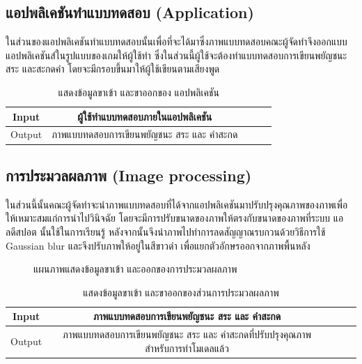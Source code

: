 \documentclass[12pt,oneside,openright,a4paper]{cpe-thai-project}
\begin{document}
\subsection{แอปพลิเคชันทำแบบทดสอบ (Application)}
ในส่วนของแอปพลิเคชันทำแบบทดสอบนั้นเพื่อที่จะได้มาซึ่งภาพแบบทดสอบคณะผู้จัดทำจึงออกแบบแอปพลิเคชันส์ในรูปแบบของเกมให้ผู้ใช้ทำ ซึ่งในส่วนนี้ผู้ใช้จะต้องทำแบบทดสอบการเขียนพยัญชนะ สระ และสะกดคำ โดยจะมีกรอบขึ้นมาให้ผู้ใช้เขียนตามเสียงพูด 
\begin{table}[!h]\centering
  \caption{แสดงข้อมูลขาเข้า และขาออกของ แอปพลิเคชัน}\label{tbl:application1}
  \begin{tabular}{c|c|l|rr} \hline
  Input & ผู้ใช้ทำแบบทดสอบภายในแอปพลิเคชัน \\ \hline
  Output & ภาพแบบทดสอบการเขียนพยัญชนะ สระ และ คำสะกด \\ \hline
  \end{tabular}
  \end{table}

\subsection{การประมวลผลภาพ (Image processing)}
ในส่วนนี้นั้นคณะผู้จัดทำจะนำภาพแบบทดสอบที่ได้จากแอปพลิเคชันมาปรับปรุงคุณภาพของภาพเพื่อให้เหมาะสมแก่การนำไปวินิจฉัย โดยจะมีการปรับขนาดของภาพให้ตรงกับขนาดของภาพที่ระบบ 
แอลดีสปอต นั้นใช้ในการเรียนรู้ หลังจากนั้นจึงนำภาพไปทำการลดสัญญาณรบกวนด้วยวิธีการใช้ Gaussian blur และจึงปรับภาพให้อยู่ในสีขาวดำ เพื่อแยกตัวอักษรออกจากภาพพื้นหลัง
\begin{figure}[!ht]\centering
  \setlength{\fboxrule}{0.2mm} %
  \setlength{\fboxsep}{1cm}
  \caption{แผนภาพแสดงข้อมูลขาเข้า และออกของการประมวลผลภาพ}\label{fig:system}
\end{figure}
\begin{table}[!h]\centering
  \caption{แสดงข้อมูลขาเข้า และขาออกของส่วนการประมวลผลภาพ}\label{tbl:application1}
  \begin{tabular}{c|c|l|rr} \hline
  Input & ภาพแบบทดสอบการเขียนพยัญชนะ สระ และ คำสะกด \\ \hline
  Output & ภาพแบบทดสอบการเขียนพยัญชนะ สระ และ คำสะกดที่ปรับปรุงคุณภาพสำหรับการทำโมเดลแล้ว \\ \hline
  \end{tabular}
  \end{table}
  
\end{document}
